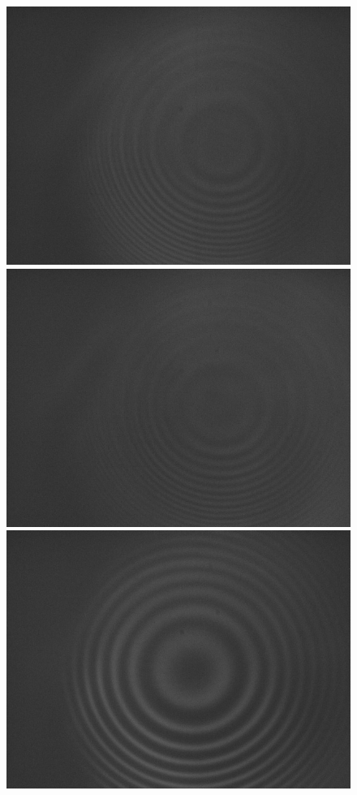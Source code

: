 \documentclass{article}
\begin{document}
\begin{figure}[H]
    \includegraphics[scale = 0.1]{15.jpg}
    \includegraphics[scale = 0.1]{16.jpg}
    \includegraphics[scale = 0.1]{17.jpg}

\end{figure}
\end{document}
